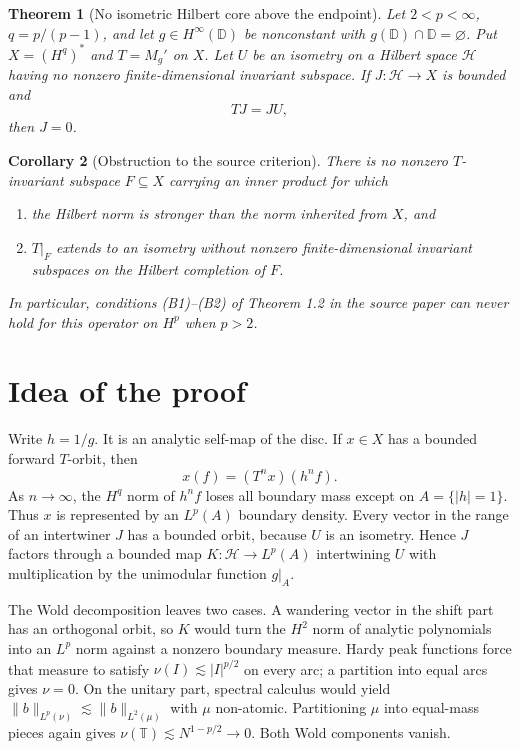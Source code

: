 \documentclass[11pt]{article}
\newtheorem{theorem}{Theorem}
\newtheorem{corollary}[theorem]{Corollary}
\newcommand{\D}{\mathbb D}
\newcommand{\T}{\mathbb T}
\begin{document}
\begin{theorem}[No isometric Hilbert core above the endpoint]
\label{thm:main}
Let $2<p<\infty$, $q=p/(p-1)$, and let $g\in H^\infty(\D)$ be nonconstant
with $g(\D)\cap\D=\varnothing$.  Put $X=(H^q)^*$ and $T=M_g'$ on $X$.
Let $U$ be an isometry on a Hilbert space $\mathcal H$ having no nonzero
finite-dimensional invariant subspace.  If $J:\mathcal H\to X$ is bounded
and
\[
 TJ=JU,
\]
then $J=0$.
\end{theorem}

\begin{corollary}[Obstruction to the source criterion]
\label{cor:criterion}
There is no nonzero $T$-invariant subspace $F\subseteq X$ carrying an inner
product for which
\begin{enumerate}[label=\textup{(\roman*)},nosep]
\item the Hilbert norm is stronger than the norm inherited from $X$, and
\item $T|_F$ extends to an isometry without nonzero finite-dimensional
invariant subspaces on the Hilbert completion of $F$.
\end{enumerate}
In particular, conditions \textup{(B1)--(B2)} of Theorem 1.2 in the source
paper can never hold for this operator on $H^p$ when $p>2$.
\end{corollary}

\section{Idea of the proof}

Write $h=1/g$.  It is an analytic self-map of the disc.  If $x\in X$ has
a bounded forward $T$-orbit, then
\[
 x(f)=(T^nx)(h^nf).
\]
As $n\to\infty$, the $H^q$ norm of $h^nf$ loses all boundary mass except on
$A=\{|h|=1\}$.  Thus $x$ is represented by an $L^p(A)$ boundary density.
Every vector in the range of an intertwiner $J$ has a bounded orbit, because
$U$ is an isometry.  Hence $J$ factors through a bounded map
$K:\mathcal H\to L^p(A)$ intertwining $U$ with multiplication by the
unimodular function $g|_A$.

The Wold decomposition leaves two cases.  A wandering vector in the shift
part has an orthogonal orbit, so $K$ would turn the $H^2$ norm of analytic
polynomials into an $L^p$ norm against a nonzero boundary measure.  Hardy peak
functions force that measure to satisfy $\nu(I)\lesssim |I|^{p/2}$ on every
arc; a partition into equal arcs gives $\nu=0$.  On the unitary part, spectral
calculus would yield $\|b\|_{L^p(\nu)}\lesssim\|b\|_{L^2(\mu)}$ with $\mu$
non-atomic.  Partitioning $\mu$ into equal-mass pieces again gives
$\nu(\T)\lesssim N^{1-p/2}\to0$.  Both Wold components vanish.
\end{document}
